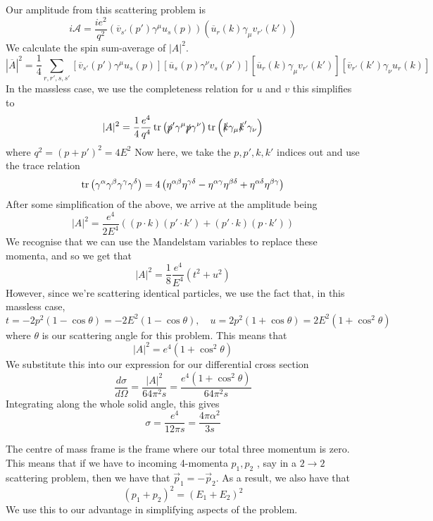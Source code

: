 Our amplitude from this 
scattering problem is 
\[
 i \mathcal{  A}  = \frac{i e ^ 2 }{q ^ 2 } 
 \left( \overline{v}_{ s ' } \left( p'  \right)  \gamma ^ \mu 
 u _ s \left( p  \right) \right) \left( 
 \overline{ u } _ r\left( k  \right)  \gamma _ \mu 
 v_{ r' } \left( k'  \right)  \right)    
\] 
We calculate the spin sum-average of $ | A | ^ 2 $. 
\[
 | \overline{ A } | ^ 2  = 
 \frac{1}{4 } \sum_{ r, r', s , s' } 
 \left[ \overline{v}_{ s'  }\left( p'  \right)  \gamma ^ \mu 
 u _ s \left( p  \right)  \right]  \left[  
 \overline{ u } _ s \left( p  \right)  \gamma ^ \nu v _ s \left( p'  \right)  \right]  \left[  
 \overline{ u } _{ r } \left( k  \right)  \gamma _ \mu v _{ r' } 
 \left( k '  \right)  \right]  \left[  
 \overline{ v } _{ r' } \left( k '  \right)  \gamma _ \nu 
 u _ r \left( k  \right) \right] 
\] 
In the massless case, we use the completeness 
relation for $ u  $ and $ v $ this simplifies to 
\[
 | A | ^ 2 =  \frac{1}{4 } \frac{ e ^ 4 }{ q ^ 4 } 
 \tr \left( \slashed{p} ' \gamma ^ \mu \slashed{p } \gamma ^ \nu  \right)  \tr \left( \slashed{k} \gamma _ \mu \slashed{k} ' \gamma _ \nu  \right) \] where $ q ^ 2 = \left( p + p'  \right)  ^ 2 
  = 4  E^ 2 $
 Now here, we take the $ p , p ' , k , k' $ indices 
 out and use the trace relation 
 \[
  \tr\left( \gamma ^ \alpha \gamma ^ \beta \gamma ^ \gamma 
  \gamma ^ \delta \right)   = 
  4 \left( \eta ^{ \alpha \beta } \eta 
  ^{ \gamma \delta }  - \eta ^{ \alpha \gamma } \eta ^{ 
  \beta \delta } + \eta ^{ \alpha \delta } \eta ^{ \beta \gamma } \right) 
 \] After some simplification of the above, 
 we arrive at the amplitude being 
 \[
  | A | ^ 2 = \frac{ e ^ 4 }{ 2 E ^ 4 } 
  \left( \left( p \cdot  k  \right)  \left( p ' \cdot  k '  \right) + \left( p ' \cdot  k  \right)  \left( p \cdot  k '  \right)    \right) 
 \] 
 We recognise that we can use the Mandelstam 
 variables to replace these momenta, 
 and so we get that 
 \[
  | A | ^ 2 = \frac{1}{8 } \frac{ e ^ 4 }{ E ^ 4 } 
  \left( t ^ 2 + u ^ 2  \right) 
 \] However, since we're scattering 
 identical particles, we use the fact that, 
 in this massless case, 
 \[
  t  =  - 2p ^ 2 \left( 1 - \cos \theta  \right) =  - 2 
  E ^ 2 \left(  1 - \cos \theta  \right) , \quad 
  u  = 2p ^ 2 \left(  1 + \cos \theta  \right) = 2 E ^ 2 
  \left(  1 + \cos ^ 2 \theta  \right) 
 \] where $ \theta $ is our scattering angle for this problem. 
 This means that 
 \[
	 | A | ^ 2 = e ^ 4  \left(  
	 1 + \cos ^ 2 \theta \right)  
 \] We substitute this into our expression for 
 our differential cross section 
 \[
 \frac{ d \sigma }{ d \Omega  }   = 
 \frac{ | A  | ^ 2 }{ 64 \pi ^ 2 s }  = \frac{
 e ^ 4 \left( 1 + \cos ^2 \theta  \right)  }{ 64 \pi ^ 2 s }
 \] Integrating along the whole solid angle, this gives 
 \[
  \sigma  = \frac{e ^ 4 }{ 12 \pi s }  = \frac{4 \pi \alpha ^ 2 }{ 3 s } 
 \] 

The centre of mass frame 
is the frame where our total three momentum is zero. 
This means that if we 
have to incoming 4-momenta $ p_1 , p_ 2 $ , say in a $ 2 \to 2 $ 
scattering problem, then 
we have that $ \vec{p}_ 1 = - \vec{p} _ 2 $. As a result, 
we also have that 
\[
	( p_1  + p_2  )^ 2  = \left(  E_1 + E_ 2  \right)^ 2  
\]  
We use this to our advantage in simplifying aspects of the 
problem. 

\pagebreak 
